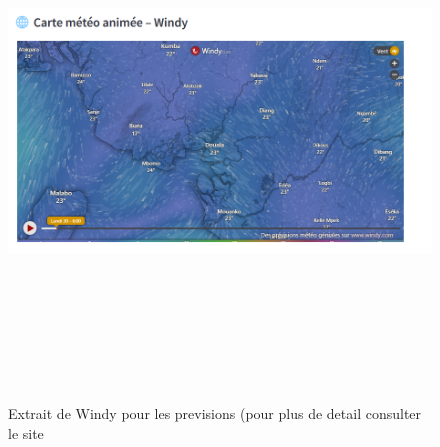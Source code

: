 \documentclass[a4paper,12pt,openany]{report}
\begin{document}
\begin{enumerate}
\begin{figure}[H]
\begin{center}
\begin{minipage}{\textwidth}
\begin{center}
				    \includegraphics[width=1\textwidth,height=5.6in]{images/site_PAD_windy.png}
				    \end{center}
				    \end{minipage}
				
			\caption{Extrait de Windy pour les previsions  (pour plus de detail consulter le site \label{Fig 3.10}}
		\end{center}
	\end{figure}%
\end{enumerate}
\end{document}
